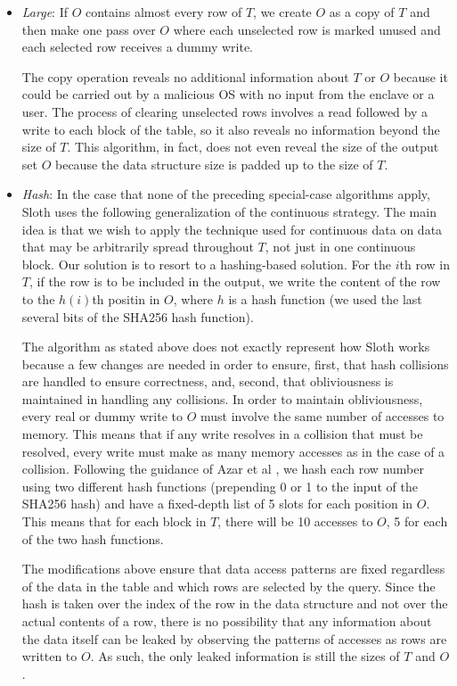 \documentclass[USenglish,oneside,twocolumn]{article}
\def\name/{Sloth}
\begin{document}
\begin{itemize}
\item \textit{Large}: If $O$ contains almost every row of $T$, we create $O$ as a copy of $T$ and then make one pass over $O$ where each unselected row is marked unused and each selected row receives a dummy write. 

The copy operation reveals no additional information about $T$ or $O$ because it could be carried out by a malicious OS with no input from the enclave or a user. The process of clearing unselected rows involves a read followed by a write to each block of the table, so it also reveals no information beyond the size of $T$. This algorithm, in fact, does not even reveal the size of the output set $O$ because the data structure size is padded up to the size of $T$. 

\item \textit{Hash}: In the case that none of the preceding special-case algorithms apply, \name/ uses the following generalization of the continuous strategy. The main idea is that we wish to apply the technique used for continuous data on data that may be arbitrarily spread throughout $T$, not just in one continuous block. Our solution is to resort to a hashing-based solution. For the $i$th row in $T$, if the row is to be included in the output, we write the content of the row to the $h(i)$th positin in $O$, where $h$ is a hash function (we used the last several bits of the SHA256 hash function).

The algorithm as stated above does not exactly represent how \name/ works because a few changes are needed in order to ensure, first, that hash collisions are handled to ensure correctness, and, second, that obliviousness is maintained in handling any collisions. In order to maintain obliviousness, every real or dummy write to $O$ must involve the same number of accesses to memory. This means that if any write resolves in a collision that must be resolved, every write must make as many memory accesses as in the case of a collision. Following the guidance of Azar et al \cite{ABKU99}, we hash each row number using two different hash functions (prepending 0 or 1 to the input of the SHA256 hash) and have a fixed-depth list of 5 slots for each position in $O$. This means that for each block in $T$, there will be 10 accesses to $O$, 5 for each of the two hash functions. 

The modifications above ensure that data access patterns are fixed regardless of the data in the table and which rows are selected by the query. Since the hash is taken over the index of the row in the data structure and not over the actual contents of a row, there is no possibility that any information about the data itself can be leaked by observing the patterns of accesses as rows are written to $O$. As such, the only leaked information is still the sizes of $T$ and $O$. 
\end{itemize}
\end{document}
